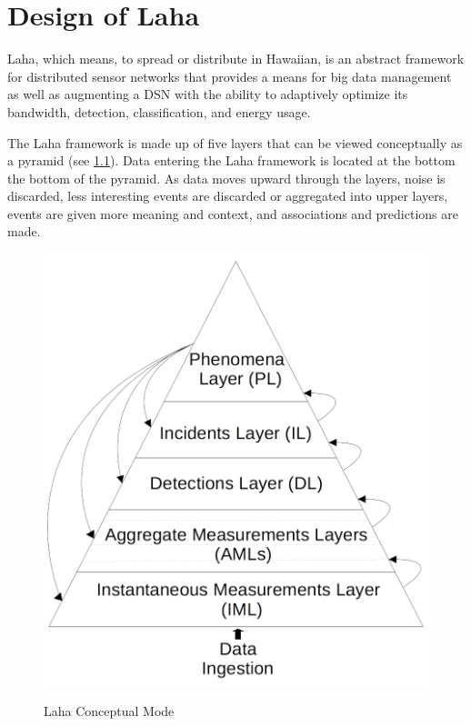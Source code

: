 \chapter{Design of Laha}

Laha, which means, to spread or distribute in Hawaiian, is an abstract framework for distributed sensor networks that provides a means for big data management as well as augmenting a DSN with the ability to adaptively optimize its bandwidth, detection, classification, and energy usage.

The Laha framework is made up of five layers that can be viewed conceptually as a pyramid (see \ref{laha-figure}). Data entering the Laha framework is located at the bottom the bottom of the pyramid. As data moves upward through the layers, noise is discarded, less interesting events are discarded or aggregated into upper layers, events are given more meaning and context, and associations and predictions are made. 

\begin{figure}
\caption{Laha Conceptual Mode}
\centering
\includegraphics{figures/laha.png}	
\label{laha-figure}
\end{figure}

